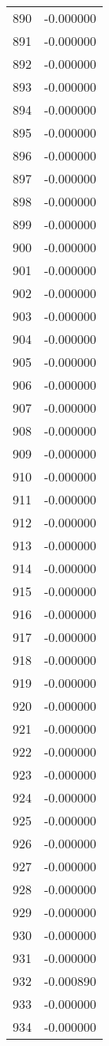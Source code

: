 \documentclass[12pt]{article}
\begin{document}
\begin{longtable}{@{}cc@{}}
890 & -0.000000 \\
891 & -0.000000 \\
892 & -0.000000 \\
893 & -0.000000 \\
894 & -0.000000 \\
895 & -0.000000 \\
896 & -0.000000 \\
897 & -0.000000 \\
898 & -0.000000 \\
899 & -0.000000 \\
900 & -0.000000 \\
901 & -0.000000 \\
902 & -0.000000 \\
903 & -0.000000 \\
904 & -0.000000 \\
905 & -0.000000 \\
906 & -0.000000 \\
907 & -0.000000 \\
908 & -0.000000 \\
909 & -0.000000 \\
910 & -0.000000 \\
911 & -0.000000 \\
912 & -0.000000 \\
913 & -0.000000 \\
914 & -0.000000 \\
915 & -0.000000 \\
916 & -0.000000 \\
917 & -0.000000 \\
918 & -0.000000 \\
919 & -0.000000 \\
920 & -0.000000 \\
921 & -0.000000 \\
922 & -0.000000 \\
923 & -0.000000 \\
924 & -0.000000 \\
925 & -0.000000 \\
926 & -0.000000 \\
927 & -0.000000 \\
928 & -0.000000 \\
929 & -0.000000 \\
930 & -0.000000 \\
931 & -0.000000 \\
932 & -0.000890 \\
933 & -0.000000 \\
934 & -0.000000 \\

\end{longtable}
\end{document}

